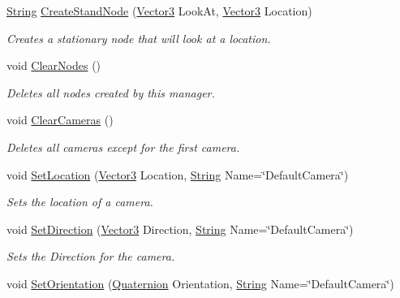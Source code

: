 \begin{DoxyCompactItemize}
\hyperlink{namespacephys_aa03900411993de7fbfec4789bc1d392e}{String} \hyperlink{classphys_1_1CameraManager_ab5f9ca6b053670e69f5812cf573d5972}{CreateStandNode} (\hyperlink{classphys_1_1Vector3}{Vector3} LookAt, \hyperlink{classphys_1_1Vector3}{Vector3} Location)
\begin{DoxyCompactList}\small\item\em Creates a stationary node that will look at a location. \item\end{DoxyCompactList}\item 
void \hyperlink{classphys_1_1CameraManager_a42d91612bbaa00187944290d6bfd44e9}{ClearNodes} ()
\begin{DoxyCompactList}\small\item\em Deletes all nodes created by this manager. \item\end{DoxyCompactList}\item 
void \hyperlink{classphys_1_1CameraManager_a76bebee0820fcfa462412cb112b1b874}{ClearCameras} ()
\begin{DoxyCompactList}\small\item\em Deletes all cameras except for the first camera. \item\end{DoxyCompactList}\item 
void \hyperlink{classphys_1_1CameraManager_a3f1b48057ca2c1cd79f3e61c9fcbe1b4}{SetLocation} (\hyperlink{classphys_1_1Vector3}{Vector3} Location, \hyperlink{namespacephys_aa03900411993de7fbfec4789bc1d392e}{String} Name=\char`\"{}DefaultCamera\char`\"{})
\begin{DoxyCompactList}\small\item\em Sets the location of a camera. \item\end{DoxyCompactList}\item 
void \hyperlink{classphys_1_1CameraManager_aaee96e189230c020d6f7b6fe439e0812}{SetDirection} (\hyperlink{classphys_1_1Vector3}{Vector3} Direction, \hyperlink{namespacephys_aa03900411993de7fbfec4789bc1d392e}{String} Name=\char`\"{}DefaultCamera\char`\"{})
\begin{DoxyCompactList}\small\item\em Sets the Direction for the camera. \item\end{DoxyCompactList}\item 
void \hyperlink{classphys_1_1CameraManager_a9d0fac66fbc2eb4b7247c9661427afb8}{SetOrientation} (\hyperlink{classphys_1_1Quaternion}{Quaternion} Orientation, \hyperlink{namespacephys_aa03900411993de7fbfec4789bc1d392e}{String} Name=\char`\"{}DefaultCamera\char`\"{})

\end{DoxyCompactItemize}
